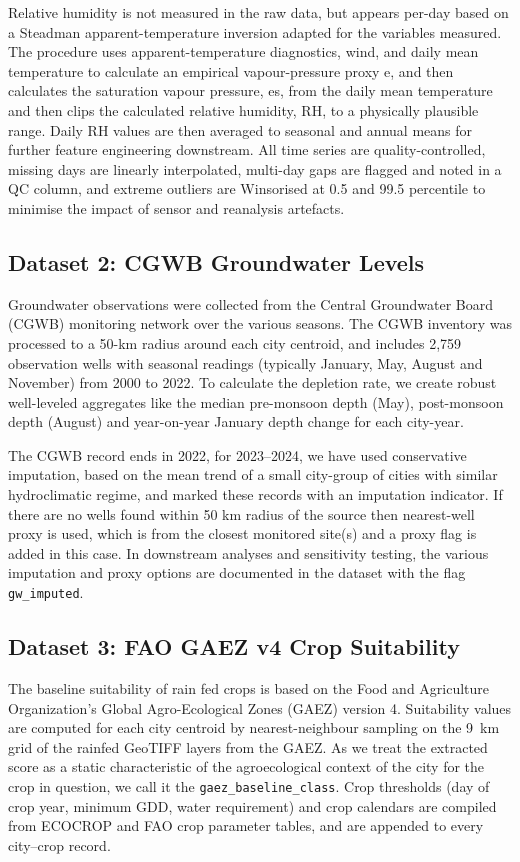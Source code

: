 \documentclass{ieeeaccess}
\begin{document}
Relative humidity is not measured in the raw data, but appears per-day based on a Steadman apparent-temperature inversion adapted for the variables measured. The procedure uses apparent-temperature diagnostics, wind, and daily mean temperature to calculate an empirical vapour-pressure proxy e, and then calculates the saturation vapour pressure, es, from the daily mean temperature and then clips the calculated relative humidity, RH, to a physically plausible range. Daily RH values are then averaged to seasonal and annual means for further feature engineering downstream. All time series are quality-controlled, missing days are linearly interpolated, multi-day gaps are flagged and noted in a QC column, and extreme outliers are Winsorised at 0.5 and 99.5 percentile to minimise the impact of sensor and reanalysis artefacts.

\subsection{Dataset 2: CGWB Groundwater Levels}
Groundwater observations were collected from the Central Groundwater Board (CGWB) monitoring network over the various seasons. The CGWB inventory was processed to a 50-km radius around each city centroid, and includes 2,759 observation wells with seasonal readings (typically January, May, August and November) from 2000 to 2022. To calculate the depletion rate, we create robust well-leveled aggregates like the median pre-monsoon depth (May), post-monsoon depth (August) and year-on-year January depth change for each city-year.

The CGWB record ends in 2022, for 2023–2024, we have used conservative imputation, based on the mean trend of a small city-group of cities with similar hydroclimatic regime, and marked these records with an imputation indicator. If there are no wells found within 50 km radius of the source then nearest-well proxy is used, which is from the closest monitored site(s) and a proxy flag is added in this case. In downstream analyses and sensitivity testing, the various imputation and proxy options are documented in the dataset with the flag \texttt{gw\_imputed}.

\subsection{Dataset 3: FAO GAEZ v4 Crop Suitability}
The baseline suitability of rain fed crops is based on the Food and Agriculture Organization's Global Agro-Ecological Zones (GAEZ) version 4. Suitability values are computed for each city centroid by nearest-neighbour sampling on the 9~km grid of the rainfed GeoTIFF layers from the GAEZ. As we treat the extracted score as a static characteristic of the agroecological context of the city for the crop in question, we call it the \texttt{gaez\_baseline\_class}. Crop thresholds (day of crop year, minimum GDD, water requirement) and crop calendars are compiled from ECOCROP and FAO crop parameter tables, and are appended to every city--crop record.
\end{document}
